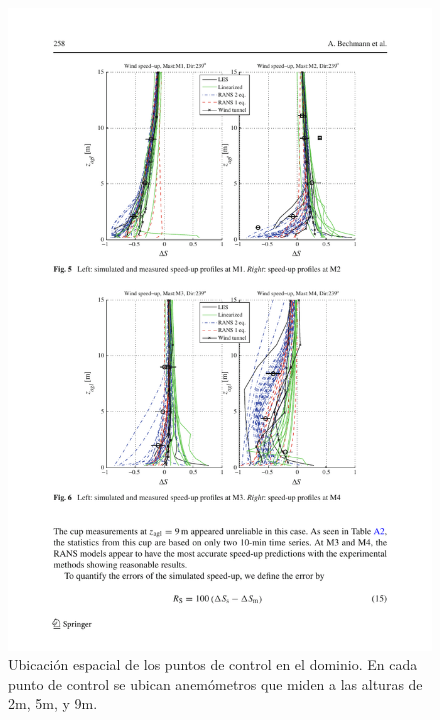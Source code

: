 \begin{figure}[H]
	\includegraphics[width=1.0\linewidth,trim={2.7cm 6.0cm 1.9cm 10.3cm},clip]{bolund3.pdf}%
	\caption{Ubicación espacial de los puntos de control en el dominio. En cada punto de control se ubican anemómetros que miden a las alturas de 2m, 5m, y 9m.}
	\label{fig:an1_speed_masts}
\end{figure}

